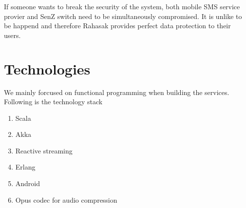 \documentclass{article}
\begin{document}
If someone wants to break the security of the system, both mobile SMS service 
provier and SenZ switch need to be simultaneously compromised. It is unlike to 
be happend and therefore Rahasak provides perfect data protection to their 
users.

\section{Technologies}

We mainly forcused on functional programming when building the services. 
Following is the technology stack

\begin{enumerate}
\item Scala 
\item Akka 
\item Reactive streaming
\item Erlang 
\item Android
\item Opus codec for audio compression
\end{enumerate}
\end{document}
